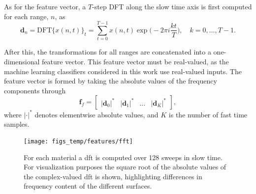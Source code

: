 
As for the feature vector, a $T$-step DFT along the slow time axis is first computed for each range, $n$, as
\begin{equation}
	\mathbf{d}_n=\text{DFT}\big\{x(n,t)\big\}_t =  \sum_{t=0}^{T-1}x(n,t)\exp\Big(-2\pi i\frac{kt}{T}\Big), \quad k=0,...,T-1.
\end{equation}

After this, the transformations for all ranges are concatenated into a one-dimensional feature vector. This feature vector must be real-valued, as the machine learning classifiers considered in this work use real-valued inputs. The feature vector is formed by taking the absolute values of the frequency components through
\begin{equation}
	\textbf{f}_{f}=\begin{bmatrix} |\mathbf{d}_0|^* & |\mathbf{d}_1|^* & \hdots & |\mathbf{d}_K|^* \end{bmatrix},
\end{equation}
where $|\cdot|^*$ denotes elementwise absolute values, and $K$ is the number of fast time samples.    



\begin{figure}[h]
	\centering
	\texttt{[image: figs\_temp/features/fft]}
	\caption{For each material a \gls{dft} is computed over 128 sweeps in slow time. For visualization purposes the square root of the absolute values of the complex-valued \gls{dft} is shown, highlighting differences in frequency content of the different surfaces.}
	\label{fig:fft}
\end{figure}


